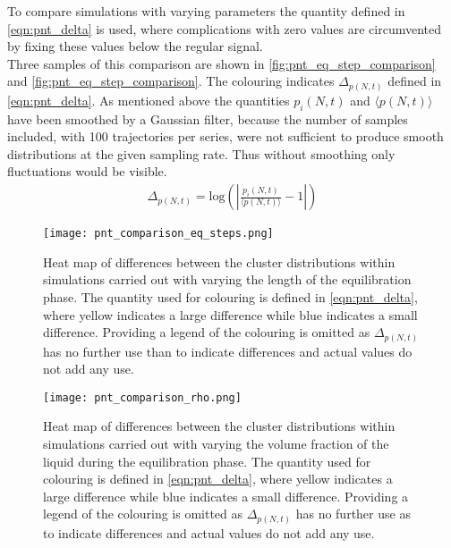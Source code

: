 To compare simulations with varying parameters the quantity defined in \autoref{eqn:pnt_delta} is used, where complications with zero values are circumvented by fixing these values below the regular signal.\\ Three samples of this comparison are shown in \autoref{fig:pnt_eq_step_comparison} and \autoref{fig:pnt_eq_step_comparison}. The colouring indicates $\Delta_{p(N,t)}$ defined in \autoref{eqn:pnt_delta}. As mentioned above the quantities $p_i(N,t)$ and $\langle p(N,t) \rangle$ have been smoothed by a Gaussian filter, because the number of samples included, with 100 trajectories per series, were not sufficient to produce smooth distributions at the given sampling rate. Thus without smoothing only fluctuations would be visible.\\ 

\begin{align}
\label{eqn:pnt_delta}
\Delta_{p(N,t)} = \text{log} \left( \left| \frac{p_i(N,t)}{\langle p(N,t) \rangle} -1 \right| \right)
\end{align}

\begin{figure}[h!]
\centering
\texttt{[image: pnt\_comparison\_eq\_steps.png]}
\caption[Heat maps of differences under variation of equilibration step number]{Heat map of differences between the cluster distributions within simulations carried out with varying the length of the equilibration phase. The quantity used for colouring is defined in \autoref{eqn:pnt_delta}, where yellow indicates a large difference while blue indicates a small difference. Providing a legend of the colouring is omitted as $\Delta_{p(N,t)}$ has no further use than to indicate differences and actual values do not add any use.}
\label{fig:pnt_eq_step_comparison}
\end{figure}


\begin{figure}[h!]
\centering
\texttt{[image: pnt\_comparison\_rho.png]}
\caption[Heat maps of differences under variation of initial density]{Heat map of differences between the cluster distributions within simulations carried out with varying the volume fraction of the liquid during the equilibration phase. The quantity used for colouring is defined in \autoref{eqn:pnt_delta}, where yellow indicates a large difference while blue indicates a small difference. Providing a legend of the colouring is omitted as $\Delta_{p(N,t)}$ has no further use as to indicate differences and actual values do not add any use.}
\label{fig:pnt_rho_comparison}
\end{figure}

